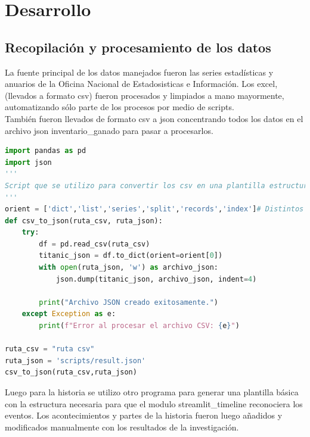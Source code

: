 \documentclass{article}
\begin{document}
\section{Desarrollo}
\subsection{Recopilación y procesamiento de los datos}
La fuente principal de los datos manejados fueron las series estadísticas y anuarios de la Oficina Nacional de Estadosisticas e Información. Los excel, (llevados a formato csv) fueron procesados y 
limpiados a mano mayormente, automatizando sólo parte de los procesos por medio de scripts. \\
También fueron llevados de formato csv a json concentrando todos los datos en el archivo json inventario\_ganado para pasar a procesarlos.

\begin{lstlisting}[language=Python, caption=Script para convertir CSV en Json]
import pandas as pd
import json
'''
Script que se utilizo para convertir los csv en una plantilla estructurada de diccionario (luego de limpiarlos) para luego desde esa estructura inicial ir reestructurando el 'inventraio_ganado.json'
'''
orient = ['dict','list','series','split','records','index']# Distintos tipos de orient para la generacion del diccionario 
def csv_to_json(ruta_csv, ruta_json):
    try:
        df = pd.read_csv(ruta_csv)    
        titanic_json = df.to_dict(orient=orient[0])    
        with open(ruta_json, 'w') as archivo_json:
            json.dump(titanic_json, archivo_json, indent=4)
            
        print("Archivo JSON creado exitosamente.")
    except Exception as e:
        print(f"Error al procesar el archivo CSV: {e}")
    
ruta_csv = "ruta csv"
ruta_json = 'scripts/result.json'
csv_to_json(ruta_csv,ruta_json)
\end{lstlisting}

Luego para la historia se utilizo otro programa para generar una plantilla básica con la estructura necesaria para que el modulo streamlit\_timeline reconociera los eventos. 
Los acontecimientos y partes de la historia fueron luego añadidos y modificados manualmente con los resultados de la investigación.
\end{document}

